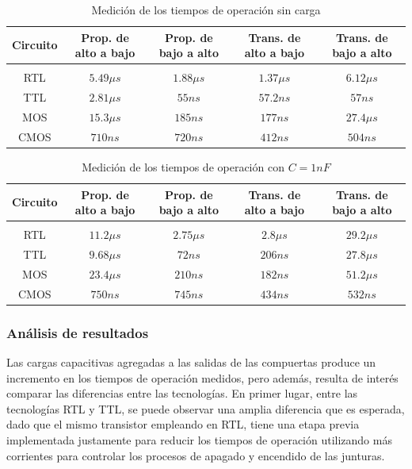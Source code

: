 \begin{table}[H]
    \centering
    \begin{tabular}{c c c c c}
        Circuito & Prop. de alto a bajo & Prop. de bajo a alto & Trans. de alto a bajo & Trans. de bajo a alto \\
        \hline \\
        RTL & $5.49\mu s$ & $1.88\mu s$ & $1.37\mu s$ & $6.12\mu s$ \\
        TTL & $2.81\mu s$ & $55ns$ & $57.2ns$ & $57n s$ \\
        MOS & $15.3\mu s$ & $185ns$ & $177ns$ & $27.4\mu s$ \\
        CMOS & $710ns$ & $720ns$ & $412ns$ & $504ns$ \\
        \hline
    \end{tabular}
    \caption{Medici\'on de los tiempos de operaci\'on sin carga}
\end{table}

\begin{table}[H]
    \centering
    \begin{tabular}{c c c c c}
        Circuito & Prop. de alto a bajo & Prop. de bajo a alto & Trans. de alto a bajo & Trans. de bajo a alto \\
        \hline \\
        RTL & $11.2\mu s$ & $2.75\mu s$ & $2.8\mu s$ & $29.2\mu s$ \\
        TTL & $9.68\mu s$ & $72ns$ & $206ns$ & $27.8 \mu s$ \\
        MOS & $23.4\mu s$ & $210ns$ & $182ns$ & $51.2\mu s$ \\
        CMOS & $750ns$ & $745ns$ & $434ns$ & $532ns$ \\
        \hline
    \end{tabular}
    \caption{Medici\'on de los tiempos de operaci\'on con $C = 1nF$}
\end{table}

\subsubsection{An\'alisis de resultados}
Las cargas capacitivas agregadas a las salidas de las compuertas produce un incremento en los tiempos de operaci\'on medidos, pero adem\'as,
resulta de inter\'es comparar las diferencias entre las tecnolog\'ias.
En primer lugar, entre las tecnolog\'ias RTL y TTL, se puede observar una amplia diferencia que es esperada, dado que el mismo transistor empleando en RTL,
tiene una etapa previa implementada justamente para reducir los tiempos de operaci\'on utilizando m\'as corrientes para controlar los procesos de apagado y encendido de las junturas.

